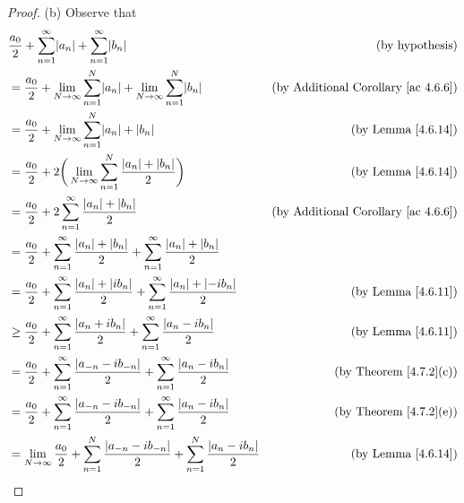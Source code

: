 \begin{proof}{(b)}
    Observe that
    \begin{align*}
         & \frac{a_0}{2} + \sum_{n = 1}^\infty \abs*{a_n} + \sum_{n = 1}^\infty \abs*{b_n}                                                             & \text{(by hypothesis)}                          \\
         & = \frac{a_0}{2} + \lim_{N \to \infty} \sum_{n = 1}^N \abs*{a_n} + \lim_{N \to \infty} \sum_{n = 1}^N \abs*{b_n}                             & \text{(by Additional Corollary \ref{ac 4.6.6})} \\
         & = \frac{a_0}{2} + \lim_{N \to \infty} \sum_{n = 1}^N \abs*{a_n} + \abs*{b_n}                                                                & \text{(by Lemma \ref{4.6.14})}                  \\
         & = \frac{a_0}{2} + 2 \bigg(\lim_{N \to \infty} \sum_{n = 1}^N \frac{\abs*{a_n} + \abs*{b_n}}{2}\bigg)                                        & \text{(by Lemma \ref{4.6.14})}                  \\
         & = \frac{a_0}{2} + 2 \sum_{n = 1}^\infty \frac{\abs*{a_n} + \abs*{b_n}}{2}                                                                   & \text{(by Additional Corollary \ref{ac 4.6.6})} \\
         & = \frac{a_0}{2} + \sum_{n = 1}^\infty \frac{\abs*{a_n} + \abs*{b_n}}{2} + \sum_{n = 1}^\infty \frac{\abs*{a_n} + \abs*{b_n}}{2}                                                               \\
         & = \frac{a_0}{2} + \sum_{n = 1}^\infty \frac{\abs*{a_n} + \abs*{i b_n}}{2} + \sum_{n = 1}^\infty \frac{\abs*{a_n} + \abs*{-i b_n}}{2}        & \text{(by Lemma \ref{4.6.11})}                  \\
         & \geq \frac{a_0}{2} + \sum_{n = 1}^\infty \frac{\abs*{a_n + i b_n}}{2} + \sum_{n = 1}^\infty \frac{\abs*{a_n - i b_n}}{2}                    & \text{(by Lemma \ref{4.6.11})}                  \\
         & = \frac{a_0}{2} + \sum_{n = 1}^\infty \frac{\abs*{a_{-n} - i b_{-n}}}{2} + \sum_{n = 1}^\infty \frac{\abs*{a_n - i b_n}}{2}                 & \text{(by Theorem \ref{4.7.2}(c))}              \\
         & = \frac{a_0}{2} + \sum_{n = 1}^\infty \frac{\abs*{a_{-n} - i b_{-n}}}{2} + \sum_{n = 1}^\infty \frac{\abs*{a_n - i b_n}}{2}                 & \text{(by Theorem \ref{4.7.2}(e))}              \\
         & = \lim_{N \to \infty} \frac{a_0}{2} + \sum_{n = 1}^N \frac{\abs*{a_{-n} - i b_{-n}}}{2} + \sum_{n = 1}^N \frac{\abs*{a_n - i b_n}}{2}       & \text{(by Lemma \ref{4.6.14})}                  \\

\end{align*}
\end{proof}
